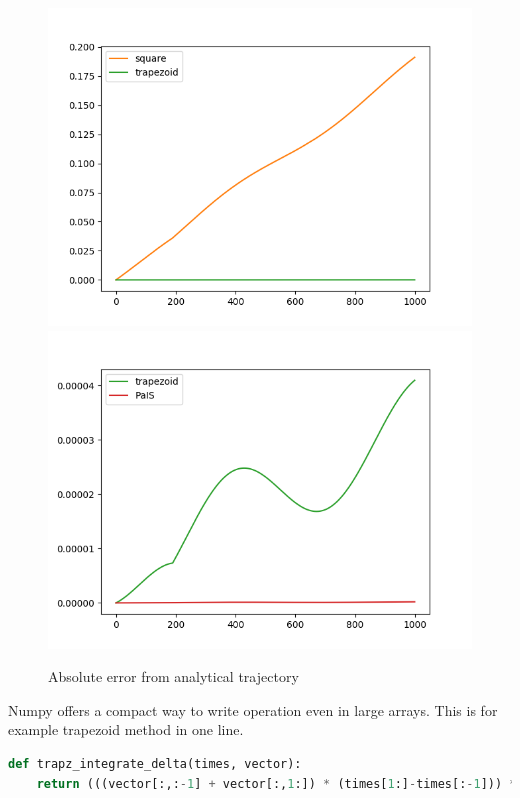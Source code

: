 \begin{figure}[H]
\includegraphics[width=\textwidth/2]{square_vs_trapezoid.png}
\includegraphics[width=\textwidth/2]{trapezoid_vs_PaIS.png}
\caption{Absolute error from analytical trajectory}
\end{figure}

\justify
Numpy offers a compact way to write operation even in large arrays. This is for example trapezoid method in one line.

\begin{lstlisting}[language=Python,frame=single,basicstyle=\footnotesize]
def trapz_integrate_delta(times, vector):
    return (((vector[:,:-1] + vector[:,1:]) * (times[1:]-times[:-1])) * 0.5).cumsum()
\end{lstlisting}

